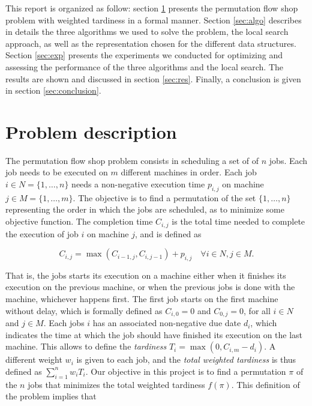 \documentclass[runningheads]{llncs}
\begin{document}
This report is organized as follow: section \ref{sec:prob} presents the
permutation flow shop problem with weighted tardiness in a formal manner.
Section \ref{sec:algo} describes in details the three algorithms we used to
solve the problem, the local search approach, as well as the representation
chosen for the different data structures. Section \ref{sec:exp} presents the
experiments we conducted for optimizing and assessing the performance of the
three algorithms and the local search. The results are shown and discussed in
section \ref{sec:res}. Finally, a conclusion is given in section
\ref{sec:conclusion}.

\section{Problem description}
\label{sec:prob}

The permutation flow shop problem consists in scheduling a set of of $n$ jobs.
Each job needs to be executed on $m$ different machines in order. Each job
$i\in N = \{1,\dots,n\}$ needs a non-negative execution time $p_{i,j}$ on machine
$j\in M = \{1,\dots, m\}$. The objective is to find a permutation of the set
$\{1,\dots,n\}$ representing the order in which the jobs are scheduled, as to
minimize some objective function. The completion time $C_{i,j}$ is the total
time needed to complete the execution of job $i$ on machine $j$, and is defined
as

\begin{equation}
	C_{i,j}=\max(C_{i-1,j}, C_{i, j-1}) + p_{i,j}\quad\forall i\in N,j\in M.
\end{equation}

That is, the jobs starts its execution on a machine either when it finishes its
execution on the previous machine, or when the previous jobs is done with the
machine, whichever happens first. The first job starts on the first machine
without delay, which is formally defined as $C_{i, 0} = 0$ and $C_{0, j} = 0$,
for all $i\in N$ and $j\in M$. Each jobs $i$ has an associated non-negative due
date $d_i$, which indicates the time at which the job should have finished its
execution on the last machine. This allows to define the \emph{tardiness}
$T_i=\max(0, C_{i, m} - d_i)$. A different weight $w_i$ is given to each job,
and the \emph{total weighted tardiness} is thus defined as $\sum_{i=1}^n
w_iT_i$. Our objective in this project is to find a permutation $\pi$ of the $n$
jobs that minimizes the total weighted tardiness $f(\pi)$. This definition of
the problem implies that
\end{document}
